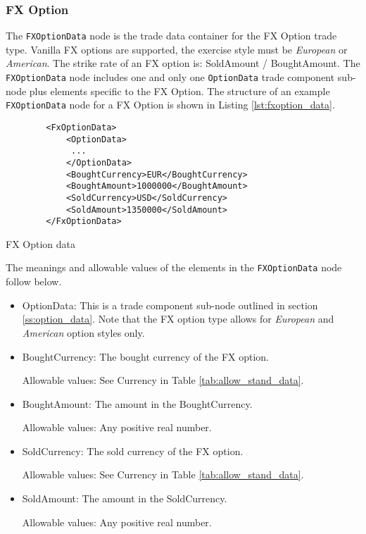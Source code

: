 \subsubsection{FX Option}

The \lstinline!FXOptionData!  node is the trade data container for the FX Option trade type.  Vanilla FX options are
supported, the exercise style must be \emph{European} or \emph{American}. The strike rate of an FX option is:
SoldAmount / BoughtAmount. The \lstinline!FXOptionData!  node includes one and only one \lstinline!OptionData! trade
component sub-node plus elements specific to the FX Option. The structure of an example \lstinline!FXOptionData! node
for a FX Option is shown in Listing \ref{lst:fxoption_data}.

\begin{listing}[H]
\begin{verbatim}
        <FxOptionData>
            <OptionData>
             ...
            </OptionData>
            <BoughtCurrency>EUR</BoughtCurrency>
            <BoughtAmount>1000000</BoughtAmount>
            <SoldCurrency>USD</SoldCurrency>
            <SoldAmount>1350000</SoldAmount>
        </FxOptionData>
\end{verbatim}
\caption{FX Option data}
\label{lst:fxoption_data}
\end{listing}

The meanings and allowable values of the elements in the \lstinline!FXOptionData!  node follow below.

\begin{itemize}
\item OptionData: This is a trade component sub-node outlined in section \ref{ss:option_data}. Note that the
  FX option type allows for \emph{European} and \emph{American} option styles only.

\item BoughtCurrency: The bought currency of the FX option.  

Allowable values:  See Currency in Table \ref{tab:allow_stand_data}.

\item BoughtAmount: The amount in the BoughtCurrency.  

Allowable values:  Any positive real number.

\item SoldCurrency: The sold currency of the FX option.  

Allowable values:  See Currency in Table \ref{tab:allow_stand_data}.

\item SoldAmount: The amount in the SoldCurrency.  

Allowable values:  Any positive real number.

\end{itemize}
